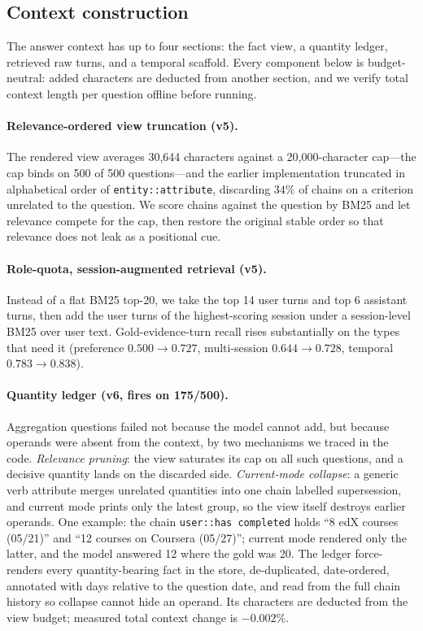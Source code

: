 \documentclass[11pt]{article}
\begin{document}
\subsection{Context construction}
\label{sec:context}

The answer context has up to four sections: the fact view, a quantity ledger, retrieved raw turns, and a temporal scaffold. Every component below is budget-neutral: added characters are deducted from another section, and we verify total context length per question offline before running.

\paragraph{Relevance-ordered view truncation (v5).} The rendered view averages 30{,}644 characters against a 20{,}000-character cap---the cap binds on 500 of 500 questions---and the earlier implementation truncated in alphabetical order of \texttt{entity::attribute}, discarding $34\%$ of chains on a criterion unrelated to the question. We score chains against the question by BM25 and let relevance compete for the cap, then restore the original stable order so that relevance does not leak as a positional cue.

\paragraph{Role-quota, session-augmented retrieval (v5).} Instead of a flat BM25 top-20, we take the top 14 user turns and top 6 assistant turns, then add the user turns of the highest-scoring session under a session-level BM25 over user text. Gold-evidence-turn recall rises substantially on the types that need it (preference $0.500 \rightarrow 0.727$, multi-session $0.644 \rightarrow 0.728$, temporal $0.783 \rightarrow 0.838$).

\paragraph{Quantity ledger (v6, fires on 175/500).} Aggregation questions failed not because the model cannot add, but because operands were absent from the context, by two mechanisms we traced in the code. \emph{Relevance pruning}: the view saturates its cap on all such questions, and a decisive quantity lands on the discarded side. \emph{Current-mode collapse}: a generic verb attribute merges unrelated quantities into one chain labelled supersession, and current mode prints only the latest group, so the view itself destroys earlier operands. One example: the chain \texttt{user::has completed} holds ``8 edX courses (05/21)'' and ``12 courses on Coursera (05/27)''; current mode rendered only the latter, and the model answered 12 where the gold was 20. The ledger force-renders every quantity-bearing fact in the store, de-duplicated, date-ordered, annotated with days relative to the question date, and read from the full chain history so collapse cannot hide an operand. Its characters are deducted from the view budget; measured total context change is $-0.002\%$.
\end{document}
